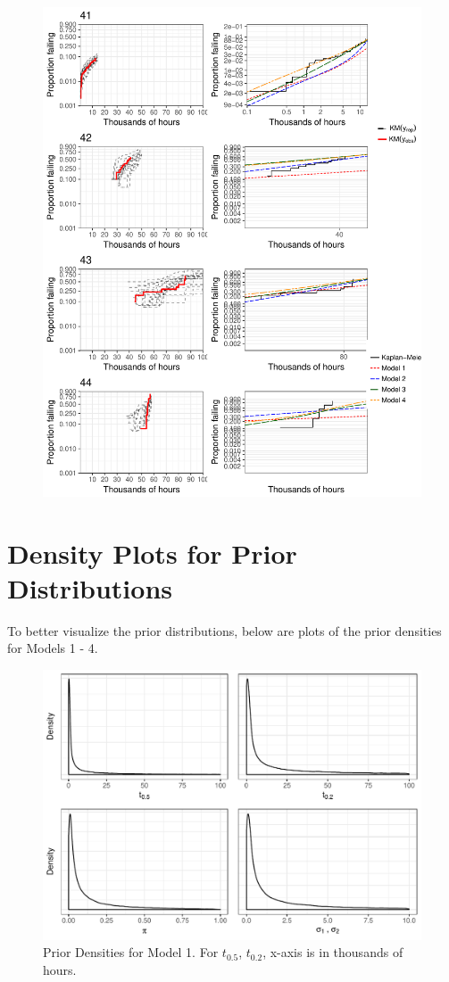 \documentclass[12pt]{article}
\begin{document}
\begin{figure}[H]
\includegraphics[width=\textwidth]{ppcheck-v2-11.pdf}
\end{figure}
\clearpage


\section{Density Plots for Prior Distributions}
To better visualize the prior distributions, below are plots of
the prior densities for Models 1 - 4.
\begin{figure}[H]
\center
\includegraphics[width=\textwidth]{priorsmod1.pdf}
\caption{Prior Densities for Model 1.  For $t_{0.5}$, $t_{0.2}$, x-axis is in thousands of hours.}
\end{figure}
\end{document}
